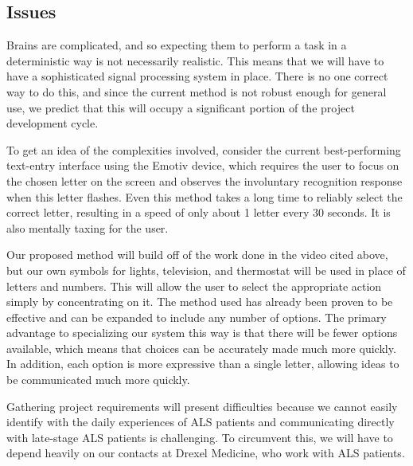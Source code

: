 \documentclass{report}
\begin{document}
\subsection*{Issues}

Brains are complicated, and so expecting them to perform a task in a
deterministic way is not necessarily realistic. This means that we will have
to have a sophisticated signal processing system in place. There is no one
correct way to do this, and since the current method is not robust enough
for general use, we predict that this will occupy a significant portion of
the project development cycle.

To get an idea of the complexities involved, consider the current
best-performing text-entry interface using the Emotiv device, which requires
the user to focus on the chosen letter on the screen and observes the
involuntary recognition response when this letter flashes. Even this method
takes a long time to reliably select the correct letter, resulting in a speed
of only about 1 letter every 30 seconds. It is also mentally taxing for the
user. \cite{textentry}

Our proposed method will build off of the work done in the video cited
above, but our own symbols for lights, television, and thermostat will be
used in place of letters and numbers. This will allow the user to select the
appropriate action simply by concentrating on it. The method used has
already been proven to be effective and can be expanded to include any
number of options. The primary advantage to specializing our system this way
is that there will be fewer options available, which means that choices can
be accurately made much more quickly. In addition, each option is more
expressive than a single letter, allowing ideas to be communicated much more
quickly.

Gathering project requirements will present difficulties because we cannot
easily identify with the daily experiences of ALS patients and communicating
directly with late-stage ALS patients is challenging. To circumvent this, we
will have to depend heavily on our contacts at Drexel Medicine, who work
with ALS patients.
\end{document}
